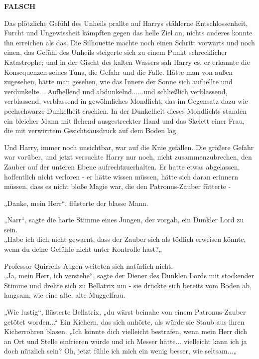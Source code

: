 {\hfill\break \textbf{FALSCH}

Das plötzliche Gefühl des Unheils prallte auf Harrys stählerne Entschlossenheit, Furcht und Ungewissheit kämpften gegen das helle Ziel an, nichts anderes konnte ihn erreichen als das. Die Silhouette machte noch einen Schritt vorwärts und noch einen, das Gefühl des Unheils steigerte sich zu einem Punkt schrecklicher Katastrophe; und in der Gischt des kalten Wassers sah Harry es, er erkannte die Konsequenzen seines Tuns, die Gefahr und die Falle. Hätte man von außen zugesehen, hätte man gesehen, wie das Innere der Sonne sich aufhellte und verdunkelte... Aufhellend und abdunkelnd......und schließlich verblassend, verblassend, verblassend in gewöhnliches Mondlicht, das im Gegensatz dazu wie pechschwarze Dunkelheit erschien. In der Dunkelheit dieses Mondlichts standen ein bleicher Mann mit flehend ausgestreckter Hand und das Skelett einer Frau, die mit verwirrtem Gesichtsausdruck auf dem Boden lag.

Und Harry, immer noch unsichtbar, war auf die Knie gefallen. Die größere Gefahr war vorüber, und jetzt versuchte Harry nur noch, nicht zusammenzubrechen, den Zauber auf der unteren Ebene aufrechtzuerhalten. Er hatte etwas abgelassen, hoffentlich nicht verloren - er hätte wissen müssen, hätte sich daran erinnern müssen, dass es nicht bloße Magie war, die den Patronus-Zauber fütterte -

„Danke, mein Herr“, flüsterte der blasse Mann.

„Narr“, sagte die harte Stimme eines Jungen, der vorgab, ein Dunkler Lord zu sein.\\ „Habe ich dich nicht gewarnt, dass der Zauber sich als tödlich erweisen könnte, wenn du deine Gefühle nicht unter Kontrolle hast?„

Professor Quirrells Augen weiteten sich natürlich nicht.\\ „Ja, mein Herr, ich verstehe“, sagte der Diener des Dunklen Lords mit stockender Stimme und drehte sich zu Bellatrix um - sie drückte sich bereits vom Boden ab, langsam, wie eine alte, alte Muggelfrau.

„Wie lustig“, flüsterte Bellatrix, „du wärst beinahe von einem Patronus-Zauber getötet worden...“ Ein Kichern, das sich anhörte, als würde sie Staub aus ihren Kicherrohren blasen. „Ich könnte dich vielleicht bestrafen, wenn mein Herr dich an Ort und Stelle einfrieren würde und ich Messer hätte... vielleicht kann ich ja doch nützlich sein? Oh, jetzt fühle ich mich ein wenig besser, wie seltsam...„

}
